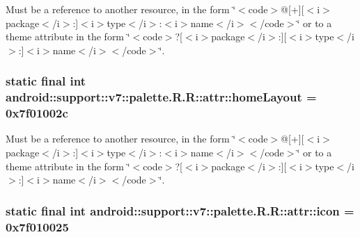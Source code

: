 Must be a reference to another resource, in the form \char`\"{}$<$code$>$@\mbox{[}+\mbox{]}\mbox{[}$<$i$>$package$<$/i$>$:\mbox{]}$<$i$>$type$<$/i$>$:$<$i$>$name$<$/i$>$$<$/code$>$\char`\"{} or to a theme attribute in the form \char`\"{}$<$code$>$?\mbox{[}$<$i$>$package$<$/i$>$:\mbox{]}\mbox{[}$<$i$>$type$<$/i$>$:\mbox{]}$<$i$>$name$<$/i$>$$<$/code$>$\char`\"{}. \hypertarget{classandroid_1_1support_1_1v7_1_1palette_1_1_r_1_1attr_874fcca6753785a5235d7eee47a0e810}{
\subsubsection[{homeLayout}]{\setlength{\rightskip}{0pt plus 5cm}static final int android::support::v7::palette.R.R::attr::homeLayout = 0x7f01002c}}
\label{classandroid_1_1support_1_1v7_1_1palette_1_1_r_1_1attr_874fcca6753785a5235d7eee47a0e810}


Must be a reference to another resource, in the form \char`\"{}$<$code$>$@\mbox{[}+\mbox{]}\mbox{[}$<$i$>$package$<$/i$>$:\mbox{]}$<$i$>$type$<$/i$>$:$<$i$>$name$<$/i$>$$<$/code$>$\char`\"{} or to a theme attribute in the form \char`\"{}$<$code$>$?\mbox{[}$<$i$>$package$<$/i$>$:\mbox{]}\mbox{[}$<$i$>$type$<$/i$>$:\mbox{]}$<$i$>$name$<$/i$>$$<$/code$>$\char`\"{}. \hypertarget{classandroid_1_1support_1_1v7_1_1palette_1_1_r_1_1attr_8b1d8e4be7c15f064a43253d2558615c}{
\subsubsection[{icon}]{\setlength{\rightskip}{0pt plus 5cm}static final int android::support::v7::palette.R.R::attr::icon = 0x7f010025}}
\label{classandroid_1_1support_1_1v7_1_1palette_1_1_r_1_1attr_8b1d8e4be7c15f064a43253d2558615c}


